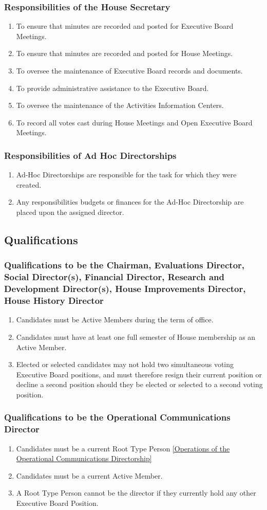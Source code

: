 \documentclass{article}
\newcommand{\asection}[1]{\subsection{#1} \label{#1}}
\newcommand{\asubsection}[1]{\subsubsection{#1} \label{#1}}
\begin{document}
\asubsection{Responsibilities of the House Secretary}
\begin{enumerate}
	\item To ensure that minutes are recorded and posted for Executive Board Meetings.
	\item To ensure that minutes are recorded and posted for House Meetings.
	\item To oversee the maintenance of Executive Board records and documents.
	\item To provide administrative assistance to the Executive Board.
	\item To oversee the maintenance of the Activities Information Centers.
	\item To record all votes cast during House Meetings and Open Executive Board Meetings.
\end{enumerate}

\asubsection{Responsibilities of Ad Hoc Directorships}
\begin{enumerate}
	\item Ad-Hoc Directorships are responsible for the task for which they were created.
	\item Any responsibilities budgets or finances for the Ad-Hoc Directorship are placed upon the assigned director.
\end{enumerate}

\asection{Qualifications}
\asubsection{Qualifications to be the Chairman, Evaluations Director, Social Director(s), Financial Director, Research and Development Director(s), House Improvements Director, House History Director}
\begin{enumerate}
	\item Candidates must be Active Members during the term of office.
	\item Candidates must have at least one full semester of House membership as an Active Member.
	\item Elected or selected candidates may not hold two simultaneous voting Executive Board positions, and must therefore resign their current position or decline a second position should they be elected or selected to a second voting position.
\end{enumerate}
\asubsection{Qualifications to be the Operational Communications Director}
\begin{enumerate}
	\item Candidates must be a current Root Type Person \ref{Operations of the Operational Communications Directorship}
	\item Candidates must be a current Active Member.
	\item A Root Type Person cannot be the director if they currently hold any other Executive Board Position.
\end{enumerate}
\end{document}
